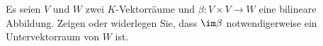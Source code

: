 \begin{question}
  Es seien $V$ und $W$ zwei $K$-Vektorräume und $\beta \colon V \times V \to W$ eine bilineare Abbildung.
  Zeigen oder widerlegen Sie, dass $\im \beta$ notwendigerweise ein Untervektorraum von $W$ ist.
\end{question}



